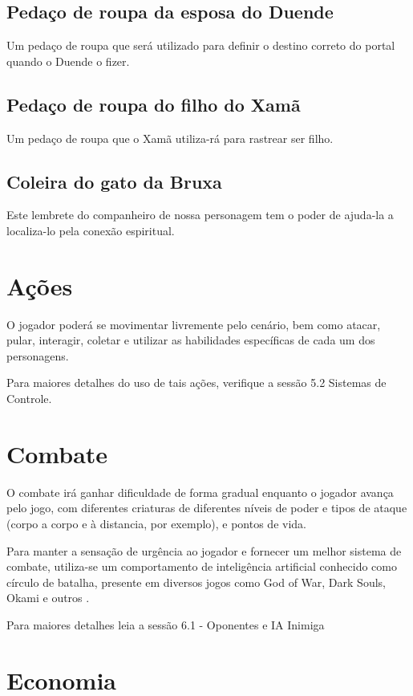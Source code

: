 \subsection{Pedaço de roupa da esposa do Duende}
Um pedaço de roupa que será utilizado para definir o destino correto do portal quando o Duende o fizer.

\subsection{Pedaço de roupa do filho do Xamã}
Um pedaço de roupa que o Xamã utiliza-rá para rastrear ser filho.

\subsection{Coleira do gato da Bruxa} 
Este lembrete do companheiro de nossa personagem tem o poder de ajuda-la a localiza-lo pela conexão espiritual.


\section{Ações}
O jogador poderá se movimentar livremente pelo cenário, bem como atacar, pular, interagir, coletar e utilizar as habilidades específicas de cada um dos personagens.

Para maiores detalhes do uso de tais ações, verifique a sessão 5.2 Sistemas de Controle.

\section{Combate}
O combate irá ganhar dificuldade de forma gradual enquanto o jogador avança pelo jogo, com diferentes criaturas de diferentes níveis de poder e tipos de ataque (corpo a corpo e à distancia, por exemplo), e pontos de vida. 

Para manter a sensação de urgência ao jogador e fornecer um melhor sistema de combate, utiliza-se um comportamento de inteligência artificial conhecido como círculo de batalha, presente em diversos jogos como God of War, Dark Souls, Okami e outros \cite{BattleCi}.

Para maiores detalhes leia a sessão 6.1 - Oponentes e IA Inimiga

\section{Economia}

